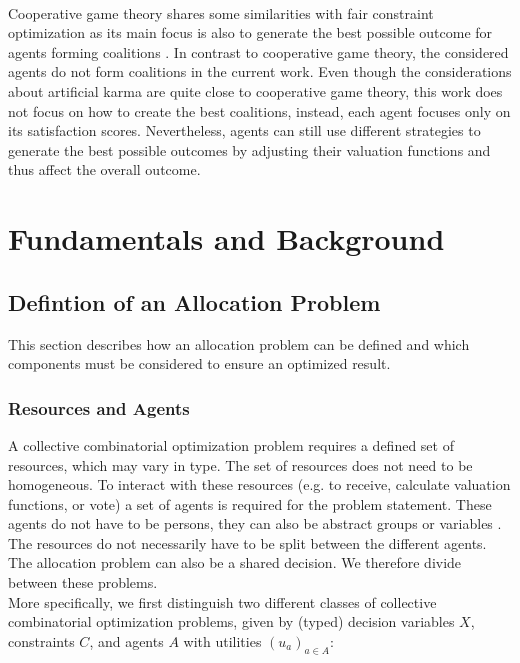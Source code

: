 \documentclass[german, a4paper, 11pt, oneside]{scrbook}
\begin{document}
\\Cooperative game theory shares some similarities with fair constraint optimization as its main focus is also to generate the best possible outcome for agents forming coalitions \cite{Ek}. In contrast to cooperative game theory, the considered agents do not form coalitions in the current work. Even though the considerations about artificial karma are quite close to cooperative game theory, this work does not focus on how to create the best coalitions, instead, each agent focuses only on its satisfaction scores. Nevertheless, agents can still use different strategies to generate the best possible outcomes by adjusting their valuation functions and thus affect the overall outcome. 
\chapter{Fundamentals and Background}
\section{Defintion of an Allocation Problem}
This section describes how an allocation problem can be defined and which components must be considered to ensure an optimized result.
\subsection{Resources and Agents}
A collective combinatorial optimization problem requires a defined set of resources, which may vary in type.  The set of resources does not need to be homogeneous. To interact with these resources (e.g. to receive, calculate valuation functions, or vote) a set of agents is required for the problem statement. These agents do not have to be persons, they can also be abstract groups or variables \cite{Ek, Brandt}. The resources do not necessarily have to be split between the different agents. The allocation problem can also be a shared decision. We therefore divide between these problems. \\More specifically, we first distinguish two different classes of collective combinatorial optimization problems, given by (typed) decision variables $X$, constraints $C$, and agents $A$ with utilities $(u_a)_{a \in A}$:
\end{document}
